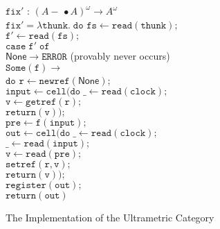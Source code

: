 \documentclass[nocopyrightspace,preprint]{sigplanconf}
\newcommand{\term}[1]{\ensuremath{\mathtt{{#1}}}}
\newcommand{\lollishrink}{-\!\!\!\,\bullet}
\newcommand{\None}{\mathsf{None}}
\begin{document}
\begin{figure}
{\begin{tabbing}
\term{fix'} : $(A \lollishrink A)^\omega \to A^\omega$ \\
\term{fix' = \lambda thunk.\;do}
  \=\term{fs \leftarrow read(thunk);} \\
  \>\term{f' \leftarrow read(fs);} \\
  \>\term{case\;f'\;of}\\
  \>\;\;\=\term{\None \to ERROR} (provably never occurs)\\
  \>    \>\term{Some(f) \to} \\
  \>    \>\;\;\term{do} \=\term{r \leftarrow newref(\None);}\\
  \>    \>  \>\term{input \leftarrow cell(do\;}\=\term{\_ \leftarrow read(clock);}\\
  \>    \>  \>                                 \>\term{v \leftarrow getref(r);}\\
  \>    \>  \>                                 \>\term{return(v));}\\
  \>    \>  \>\term{pre \leftarrow f(input);}\\
  \>    \>  \>\term{out \leftarrow cell(do\;}\=\term{\_ \leftarrow read(clock);} \\
  \>    \>  \>                               \>\term{\_ \leftarrow read(input);} \\
  \>    \>  \>                               \>\term{v \leftarrow read(pre);}\\
  \>    \>  \>                               \>\term{setref(r, v);}\\
  \>    \>  \>                               \>\term{return(v));}\\
  \>    \>  \>\term{register(out);}\\
  \>    \>  \>\term{return(out)}
\end{tabbing}
}
\caption{The Implementation of the Ultrametric Category}
\label{ultrametric-implementation}
\end{figure}
\end{document}
